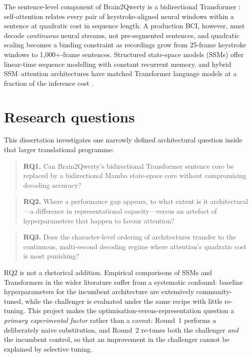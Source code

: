 \documentclass[11pt,a4paper]{report}
\begin{document}
The sentence-level component of Brain2Qwerty is a bidirectional Transformer
\citep{vaswani2017attention}: self-attention relates every pair of
keystroke-aligned neural windows within a sentence at quadratic cost in
sequence length. A production BCI, however, must decode \emph{continuous}
neural streams, not pre-segmented sentences, and quadratic scaling becomes a
binding constraint as recordings grow from 25-frame keystroke windows to
1{,}000+-frame sentences. Structured state-space models (SSMs)
\citep{gu2021s4,gu2023mamba,dao2024transformers} offer linear-time sequence
modelling with constant recurrent memory, and hybrid SSM--attention
architectures have matched Transformer language models at a fraction of the
inference cost \citep{nvidia2025nemotronh}.

\section{Research questions}
This dissertation investigates one narrowly defined architectural question
inside that larger translational programme:

\begin{quote}
\textbf{RQ1.} Can Brain2Qwerty's bidirectional Transformer sentence core be
replaced by a bidirectional Mamba state-space core without compromising
decoding accuracy?
\end{quote}
\begin{quote}
\textbf{RQ2.} Where a performance gap appears, to what extent is it
architectural---a difference in representational capacity---versus an
artefact of hyperparameters that happen to favour attention?
\end{quote}
\begin{quote}
\textbf{RQ3.} Does the character-level ordering of architectures transfer to
the continuous, multi-second decoding regime where attention's quadratic cost
is most punishing?
\end{quote}

RQ2 is not a rhetorical addition. Empirical comparisons of SSMs and
Transformers in the wider literature suffer from a systematic confound:
baseline hyperparameters for the incumbent architecture are extensively
community-tuned, while the challenger is evaluated under the same recipe with
little re-tuning. This project makes the optimisation-versus-representation
question a \emph{primary experimental factor} rather than a caveat: Round~1
performs a deliberately naive substitution, and Round~2 re-tunes both the
challenger \emph{and} the incumbent control, so that an improvement in the
challenger cannot be explained by selective tuning.
\end{document}
